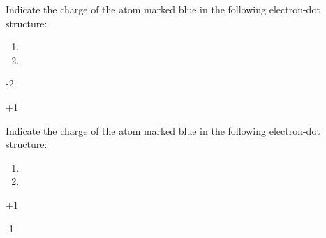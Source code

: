 \documentclass[main.tex]{subfiles}
\begin{document}
\begin{multicols*}{2}
\begin{question}[ID=\the\value{numA}]
\end{question}
\begin{solution}
\hspace{.05in}
\end{solution}
\begin{question}[ID=\the\value{numA}]
Indicate the charge of the atom marked blue in the following electron-dot structure:
\vspace{0.3cm}\begin{multicols*}{2}
\begin{enumerate}[label=(\alph*)]
\item {} 
\item {}
\end{enumerate}\end{multicols*}
\end{question}
\begin{solution} 
 \begin{inparaenum}[(a)]
\item -2
\item +1
 \end{inparaenum}\hspace{0.1cm}\end{solution}
\begin{question}[ID=\the\value{numA}]
Indicate the charge of the atom marked blue in the following electron-dot structure:
\vspace{0.3cm}\begin{multicols*}{2}
\begin{enumerate}[label=(\alph*)]
\item {}
\item {}
\end{enumerate}
\end{multicols*}
\end{question}
\begin{solution} 
 \begin{inparaenum}[(a)]
\item +1
\item -1
 \end{inparaenum}\hspace{0.1cm}\end{solution}


\end{multicols*}
\end{document}
